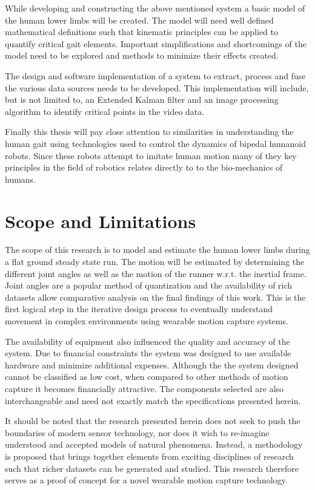 While developing and constructing the above mentioned system a basic model of the human lower limbs will be created. The model will need well defined mathematical definitions such that kinematic principles can be applied to quantify critical gait elements. Important simplifications and shortcomings of the model need to be explored and methods to minimize their effects created.

The design and software implementation of a system to extract, process and fuse the various data sources needs to be developed. This implementation will include, but is not limited to, an Extended Kalman filter and an image processing algorithm to identify critical points in the video data.

Finally this thesis will pay close attention to similarities in understanding the human gait using technologies used to control the dynamics of bipedal humanoid robots. Since these robots attempt to imitate human motion many of they key principles in the field of robotics relates directly to to the bio-mechanics of humans.

\section{Scope and Limitations}
The scope of this research is to model and estimate the human lower limbs during a flat ground steady state run. The motion will be estimated by determining the different joint angles as well as the motion of the runner w.r.t. the inertial frame. Joint angles are a popular method of quantization and the availability of rich datasets allow comparative analysis on the final findings of this work. This is the first logical step in the iterative design process to eventually understand movement in complex environments using wearable motion capture systems.

The availability of equipment also influenced the quality and accuracy of the system. Due to financial constraints the system was designed to use available hardware and minimize additional expenses. Although the the system designed cannot be classified as low cost, when compared to other methods of motion capture it becomes financially attractive. The components selected are also interchangeable and need not exactly match the specifications presented herein.

It should be noted that the research presented herein does not seek to push the boundaries of modern sensor technology, nor does it wish to re-imagine understood and accepted models of natural phenomena. Instead, a methodology is proposed that brings together elements from exciting disciplines of research such that richer datasets can be generated and studied. This research therefore serves as a proof of concept for a novel wearable motion capture technology.

